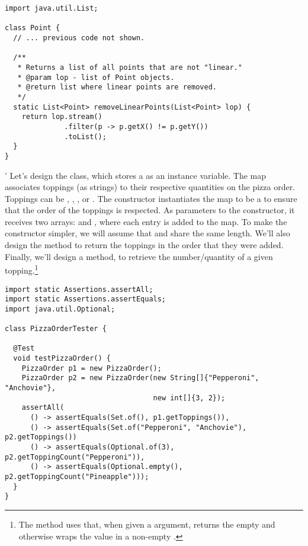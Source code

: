 \begin{lstlisting}[language=MyJava]
import java.util.List;

class Point {
  // ... previous code not shown. 

  /**
   * Returns a list of all points that are not "linear."
   * @param lop - list of Point objects.
   * @return list where linear points are removed.
   */
  static List<Point> removeLinearPoints(List<Point> lop) {
    return lop.stream()
              .filter(p -> p.getX() != p.getY())
              .toList();
  }
}
\end{lstlisting}

'
Let's design the  class, which stores a  as an instance variable.
The map associates toppings (as strings) to their respective quantities on the pizza order. 
Toppings can be , , , or .
The  constructor instantiates the map to be a  to ensure that the order of the toppings is respected.
As parameters to the constructor, it receives two arrays:  and , where each entry is added to the map.
To make the constructor simpler, we will assume that  and  share the same length.
We'll also design the  method to return the toppings in the order that they were added.
Finally, we'll design a method,  to retrieve the number/quantity of a given topping.\footnote{The  method uses  that, when given a  argument, returns the empty  and otherwise wraps the value in a non-empty .}

\begin{lstlisting}[language=MyJava]
import static Assertions.assertAll;
import static Assertions.assertEquals;
import java.util.Optional;

class PizzaOrderTester {

  @Test
  void testPizzaOrder() {
    PizzaOrder p1 = new PizzaOrder();
    PizzaOrder p2 = new PizzaOrder(new String[]{"Pepperoni", "Anchovie"},
                                   new int[]{3, 2});
    assertAll(
      () -> assertEquals(Set.of(), p1.getToppings()),
      () -> assertEquals(Set.of("Pepperoni", "Anchovie"), p2.getToppings())
      () -> assertEquals(Optional.of(3), p2.getToppingCount("Pepperoni")),
      () -> assertEquals(Optional.empty(), p2.getToppingCount("Pineapple")));
  }
}
\end{lstlisting}

